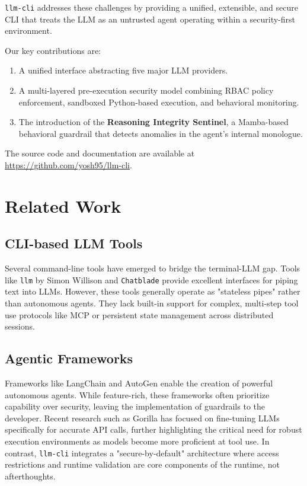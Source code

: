 \documentclass[conference]{IEEEtran}
\begin{document}
\texttt{llm-cli} addresses these challenges by providing a unified, extensible, and secure CLI that treats the LLM as an untrusted agent operating within a security-first environment.

Our key contributions are:
\begin{enumerate}
    \item A unified interface abstracting five major LLM providers.
    \item A multi-layered pre-execution security model combining RBAC policy enforcement, sandboxed Python-based execution, and behavioral monitoring.
    \item The introduction of the \textbf{Reasoning Integrity Sentinel}, a Mamba-based behavioral guardrail that detects anomalies in the agent's internal monologue.
\end{enumerate}

The source code and documentation are available at \url{https://github.com/yosh95/llm-cli}.

\section{Related Work}

\subsection{CLI-based LLM Tools}
Several command-line tools have emerged to bridge the terminal-LLM gap. Tools like \texttt{llm} by Simon Willison and \texttt{Chatblade} provide excellent interfaces for piping text into LLMs. However, these tools generally operate as "stateless pipes" rather than autonomous agents. They lack built-in support for complex, multi-step tool use protocols like MCP or persistent state management across distributed sessions.

\subsection{Agentic Frameworks}
Frameworks like LangChain \cite{langchain} and AutoGen \cite{autogen} enable the creation of powerful autonomous agents. While feature-rich, these frameworks often prioritize capability over security, leaving the implementation of guardrails to the developer. Recent research such as Gorilla \cite{gorilla} has focused on fine-tuning LLMs specifically for accurate API calls, further highlighting the critical need for robust execution environments as models become more proficient at tool use. In contrast, \texttt{llm-cli} integrates a "secure-by-default" architecture where access restrictions and runtime validation are core components of the runtime, not afterthoughts.
\end{document}
